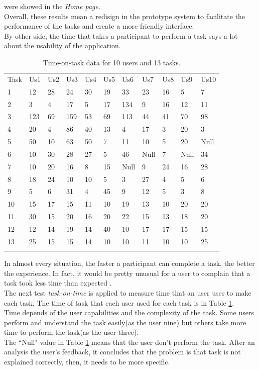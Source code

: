 were showed in the \textit{Home page}.\\ 
Overall, these results mean a redisign in the
prototype system to facilitate the performance of the tasks 
and create a more friendly interface.\\ 
By other side, the time that takes a participant to perform a task
says a lot about the usability of the application. 
\begin{table}
\centering
\small
\captionsetup{font=footnotesize}
\caption{Time-on-task data for 10 users and 13 tasks.}
\label{tab:datausers}  
\begin{tabular}{lllllllllll}
\hline\noalign{\smallskip}
Task  & Us1  & Us2 & Us3 & Us4 & Us5 & Us6 & Us7 & Us8 & Us9 & Us10 \\
\noalign{\smallskip}\hline\noalign{\smallskip}
1 & 12  & 28 & 24 & 30 & 19 & 33  & 23 & 16 & 5  & 7 \\
2 & 3   & 4  & 17 & 5  & 17 & 134 & 9  & 16 & 12 & 11 \\
3 & 123 & 69 & 159& 53 & 69 & 113 & 44 & 41 & 70 & 98 \\
4 & 20  & 4  & 86 & 40 & 13 & 4   & 17 & 3  & 20 & 3 \\
5 & 50  & 10 & 63 & 50 & 7  & 11  & 10 & 5  & 20 & Null \\
6 & 10  & 30 & 28 & 27 & 5  & 46  & Null  & 7  & Null  & 34 \\
7 & 10  & 20 & 16 & 8  & 15 & Null & 9  & 24 & 16 & 28 \\
8 & 18  & 24 & 10 & 10 & 5  & 3   & 27 & 4  & 5  & 6 \\
9 & 5   & 6  & 31 & 4  & 45 & 9   & 12 & 5  & 3  & 8 \\
10 & 15 & 17 & 15 & 11 & 10 & 19  & 13 & 10 & 20 & 20 \\
11 & 30 & 15 & 20 & 16 & 20 & 22  & 15 & 13 & 18 & 20 \\
12 & 12 & 14 & 19 & 14 & 40 & 10  & 17 & 17 & 15 & 15 \\
13 & 25 & 15 & 15 & 14 & 10 & 10  & 11 & 10 & 10 & 25 \\
\noalign{\smallskip}\hline
\end{tabular}
\end{table}
In almost every
situation, the faster a participant can complete a task, the better
the experience. In fact, it would be pretty unusual for a user to
complain that a task took less time than
expected  \cite{albert2013measuring}.\\  The next test 
\textit{task-on-time} is applied to measure time that an user 
uses to make each task.
The time of task that each user used for each task is in Table
 \ref{tab:datausers}. \\Time depends of the user capabilities and the
complexity of the task. Some users perform and understand the task
easily(as the user nine) but others take more time to perform the task(as
the user three). \\The ``Null" value in Table  \ref{tab:datausers} means that
the user don't perform the task. After an analysis the user's
feedback, it concludes that the problem is that task is not explained
correctly, then, it needs to be more specific.

